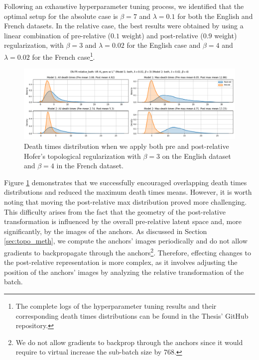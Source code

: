 \documentclass[../main.tex]{subfiles}
\begin{document}
Following an exhaustive hyperparameter tuning process, we identified that the optimal setup for the absolute case is $\beta=7$ and $\lambda=0.1$ for both the English and French datasets. In the relative case, the best results were obtained by using a linear combination of pre-relative ($0.1$ weight) and post-relative ($0.9$ weight) regularization, with $\beta=3$ and $\lambda=0.02$ for the English case and $\beta=4$ and $\lambda=0.02$ for the French case\footnote{The complete logs of the hyperparameter tuning results and their corresponding death times distributions can be found in the Thesis' GitHub repository.}.\\


\begin{figure}[ht!]
    \centering
    \includegraphics[width=\textwidth]{figures/rs/stitching/en_fr_relative_both_both_both_3_4_seed1.png} 
    \caption{Death times distribution when we apply both pre and post-relative Hofer's topological regularization with $\beta=3$ on the English dataset and $\beta=4$ in the French dataset.}
    \label{fig:distBoth}
\end{figure}


Figure \ref{fig:distBoth} demonstrates that we successfully encouraged overlapping death times distributions and reduced the maximum death times means. However, it is worth noting that moving the post-relative max distribution proved more challenging. This difficulty arises from the fact that the geometry of the post-relative transformation is influenced by the overall pre-relative latent space and, more significantly, by the images of the anchors. As discussed in Section \ref{sec:topo_meth}, we compute the anchors' images periodically and do not allow gradients to backpropagate through the anchors\footnote{We do not allow gradients to backprop through the anchors since it would require to virtual increase the sub-batch size by 768.}. Therefore, effecting changes to the post-relative representation is more complex, as it involves adjusting the position of the anchors' images by analyzing the relative transformation of the batch.\\
\end{document}
